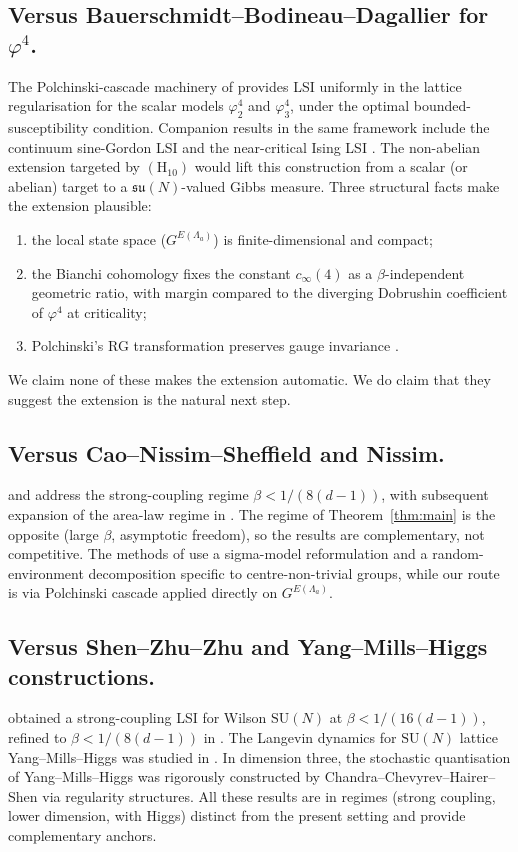 \documentclass[11pt,reqno]{amsart}
\theoremstyle{plain}
\theoremstyle{definition}
\theoremstyle{remark}
\newcommand{\Lat}{\Lambda}
\newcommand{\sun}{\mathfrak{su}(N)}
\begin{document}
\subsection{Versus Bauerschmidt--Bodineau--Dagallier for $\varphi^4$.}
The Polchinski-cascade machinery of \cite{BD22, BBD24} provides LSI uniformly in the lattice regularisation for the scalar models $\varphi^4_2$ and $\varphi^4_3$, under the optimal bounded-susceptibility condition. Companion results in the same framework include the continuum sine-Gordon LSI \cite{BB21} and the near-critical Ising LSI \cite{BDIsing}. The non-abelian extension targeted by $(\mathrm{H}_{10})$ would lift this construction from a scalar (or abelian) target to a $\sun$-valued Gibbs measure. Three structural facts make the extension plausible:
\begin{enumerate}[leftmargin=*]
  \item the local state space ($G^{E(\Lat_a)}$) is finite-dimensional and compact;
  \item the Bianchi cohomology fixes the constant $c_\infty(4)$ as a $\beta$-independent geometric ratio, with margin compared to the diverging Dobrushin coefficient of $\varphi^4$ at criticality;
  \item Polchinski's RG transformation preserves gauge invariance \cite{Polchinski1984}.
\end{enumerate}
We claim none of these makes the extension automatic. We do claim that they suggest the extension is the natural next step.

\subsection{Versus Cao--Nissim--Sheffield and Nissim.}
\cite{CNS25} and \cite{Nissim25} address the strong-coupling regime $\beta < 1/(8(d-1))$, with subsequent expansion of the area-law regime in \cite{CNS25b}. The regime of Theorem~\ref{thm:main} is the opposite (large $\beta$, asymptotic freedom), so the results are complementary, not competitive. The methods of \cite{CNS25, Nissim25} use a sigma-model reformulation and a random-environment decomposition specific to centre-non-trivial groups, while our route is via Polchinski cascade applied directly on $G^{E(\Lat_a)}$.

\subsection{Versus Shen--Zhu--Zhu and Yang--Mills--Higgs constructions.}
\cite{SZZ22} obtained a strong-coupling LSI for Wilson $\mathrm{SU}(N)$ at $\beta < 1/(16(d-1))$, refined to $\beta < 1/(8(d-1))$ in \cite{CNS25}. The Langevin dynamics for $\mathrm{SU}(N)$ lattice Yang--Mills--Higgs was studied in \cite{SZZ24}. In dimension three, the stochastic quantisation of Yang--Mills--Higgs was rigorously constructed by Chandra--Chevyrev--Hairer--Shen \cite{CCHS22} via regularity structures. All these results are in regimes (strong coupling, lower dimension, with Higgs) distinct from the present setting and provide complementary anchors.
\end{document}
